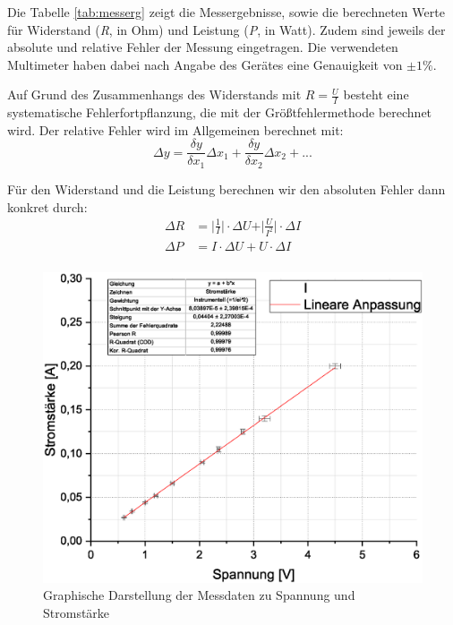 \documentclass[10pt,a4paper]{article}
\begin{document}

\begin{flushleft}
Die Tabelle \ref{tab:messerg} zeigt die Messergebnisse, sowie die berechneten Werte für Widerstand (\textit{R}, in Ohm) und Leistung (\textit{P}, in Watt). Zudem sind jeweils der absolute und relative Fehler der Messung eingetragen. Die verwendeten Multimeter haben dabei nach Angabe des Gerätes eine Genauigkeit von $\pm1\%$.

Auf Grund des Zusammenhangs des Widerstands mit $R = \frac{U}{I}$ besteht eine systematische Fehlerfortpflanzung, die mit der Größtfehlermethode berechnet wird. Der relative Fehler wird im Allgemeinen berechnet mit:
\begin{equation*}
\Delta y = \frac{\delta y}{\delta x_1} \Delta x_1 + \frac{\delta y}{\delta x_2} \Delta x_2 + ...
\end{equation*}

Für den Widerstand und die Leistung berechnen wir den absoluten Fehler dann konkret durch:
\begin{align*}
\Delta R &= \vert\frac{1}{I}\vert \cdot \Delta U + \vert\frac{U}{I^2}\vert \cdot \Delta I \\
\Delta P &= I \cdot \Delta U + U \cdot \Delta I \\
\end{align*}
\end{flushleft}

\begin{figure}[H]
\centering
\includegraphics[scale=0.5]{Graph1}
\caption[Graph: Spannung \& Strom]{Graphische Darstellung der Messdaten zu Spannung und Stromstärke}
\label{fig:SpannStrom}
\end{figure}
\end{document}
